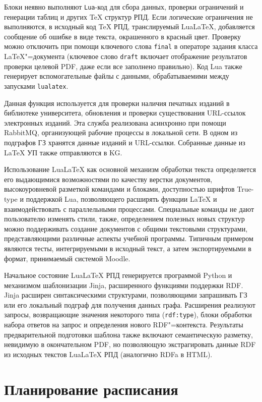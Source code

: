 \documentclass[
]{aiitart}
\providecommand{\LuaLaTeX}{Lua\LaTeX}
\begin{document}
Блоки неявно выполняют \verb|Lua|-код для сбора данных, проверки ограничений и генерации таблиц и других \TeX{} структур РПД. Если логические ограничения не выполняются, в исходный код \TeX{} РПД, транслируемый \LuaLaTeX{}, добавляется сообщение об ошибке в виде текста, окрашенного в красный цвет. Проверку можно отключить при помощи ключевого слова \verb|final| в операторе задания класса \LaTeX"=документа  (ключевое слово \verb|draft| включает отображение результатов проверки целевой PDF, даже если все заполнено правильно). Код Lua также генерирует вспомогательные файлы с данными, обрабатываемими между запусками \verb|lualatex|.

Данная функция используется для проверки наличия печатных изданий в библиотеке университета, обновления и проверки существования URL-ссылок электронных изданий. Эта служба реализована асинхронно при помощи RabbitMQ, организующей рабочие процессы в локальной сети. В одном из подграфов ГЗ хранятся данные изданий и URL-ссылки. Собранные данные из \LaTeX{} УП также отправляются в KG.

Использование \LuaLaTeX{} как основной механизм обработки текста определяется его выдающимися возможностями по качеству верстки документов, высокоуровневой разметкой командами и блоками, доступностью шрифтов True-type и поддержкой Lua, позволяющего расширять функции \LaTeX{} и взаимодействовать с параллельными процессами. Специальные команды не дают пользователю изменять стили, также, определением полезных новых структур можно поддерживать создание документов с общими текстовыми структурами, представляющими различные аспекты учебной программы. Типичным примером являются тесты, интегрируемыми в исходный текст, а затем экспортируемыми в формат, принимаемый системой Moodle.

Начальное состояние \LuaLaTeX{} РПД генерируется программой Python и механизмом шаблонизации Jinja, расширенного функциями поддержки RDF. Jinja расширен синтаксическими структурами, позволяющими запрашивать ГЗ или его локальный подграф для получения данных графа. Расширения реализуют запросы, возвращающие значения некоторого типа (\verb|rdf:type|), блоки обработки набора ответов на запрос и определения нового RDF"=контекста. Результаты предварительной подготовки шаблона также включают семантическую разметку, невидимую в окончательном PDF, но позволяющую экстрагировать данные RDF из исходных текстов \LuaLaTeX{} РПД (аналогично RDFa в HTML).

\section{Планирование расписания}
\end{document}
